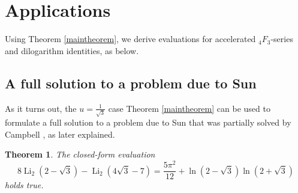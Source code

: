 \documentclass[12pt]{article}
\newtheorem{theorem}{Theorem}
\begin{document}
\section{Applications}
 Using Theorem \ref{maintheorem}, we derive evaluations for accelerated ${}_{4}F_{3}$-series and dilogarithm identities, as below. 

\subsection{A full solution to a problem due to Sun}
 As it turns out, the $u = \frac{1}{\sqrt{3}}$ case Theorem \ref{maintheorem} can be used to formulate a full solution to a problem due 
 to Sun \cite{Sun2021,Sun2015} that was partially solved by Campbell \cite{Campbell2023}, as later explained. 

\begin{theorem}\label{theoremSunCampbell}
 The closed-form evaluation
 $$ 8 \operatorname{Li}_2\left(2-\sqrt{3}\right)-\operatorname{Li}_2\left(4 \sqrt{3} - 7 \right) 
 = \frac{5 \pi ^2}{12}+\ln \left(2-\sqrt{3}\right) \ln \left(2+\sqrt{3}\right) $$
 holds true.
\end{theorem}
\end{document}
